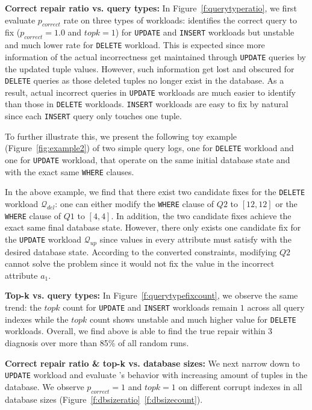 \textbf{Correct repair ratio vs. query types: } In Figure~\ref{f:querytyperatio}, we first evaluate $p_{correct}$ rate on three types of workloads: \sys identifies the correct query to fix ($p_{correct} = 1.0$ and $topk = 1$) for \texttt{UPDATE} and \texttt{INSERT} workloads but unstable and much lower rate for \texttt{DELETE} workload. This is expected since more information of the actual incorrectness get maintained through \texttt{UPDATE} queries by the updated tuple values.  However, such information get lost and obscured for \texttt{DELETE} queries as those deleted tuples no longer exist in the database. As a result, actual incorrect queries in \texttt{UPDATE} workloads are much easier to identify than those in \texttt{DELETE} workloads. \texttt{INSERT} workloads are easy to fix by natural since each \texttt{INSERT} query only touches one tuple. 

To further illustrate this, we present the following toy example (Figure~\ref{fig:example2}) of two simple query logs, one for \texttt{DELETE} workload and one for \texttt{UPDATE} workload, that operate on the same initial database state and with the exact same \texttt{WHERE} clauses. 

In the above example, we find that there exist two candidate fixes for the \texttt{DELETE} workload $\mathcal{Q}_{del}$: one can either modify the \texttt{WHERE} clause of $Q2$ to $[12, 12]$ or the \texttt{WHERE} clause of $Q1$ to $[4, 4]$. In addition, the two candidate fixes achieve the exact same final database state. However, there only exists one candidate fix for the \texttt{UPDATE} workload $\mathcal{Q}_{up}$ since values in every attribute must satisfy with the desired database state. According to the converted constraints, modifying $Q2$ cannot solve the problem since it would not fix the value in the incorrect attribute $a_1$.  

\textbf{Top-k vs. query types: } In Figure~\ref{f:querytypefixcount}, we observe the same trend: the $topk$ count for \texttt{UPDATE} and \texttt{INSERT} workloads remain $1$ across all query indexes while the $topk$ count shows unstable and much higher value for \texttt{DELETE} workloads. Overall, we find \sys above is able to find the true repair within 3 diagnosis over more than 85\% of all random runs. 

\textbf{Correct repair ratio \& top-k vs. database sizes: } We next narrow down to \texttt{UPDATE} workload and evaluate \sys's behavior with increasing amount of tuples in the database. We observe $p_{correct} = 1$ and $topk = 1$ on different corrupt indexes in all database sizes (Figure~\ref{f:dbsizeratio}~\ref{f:dbsizecount}). 

